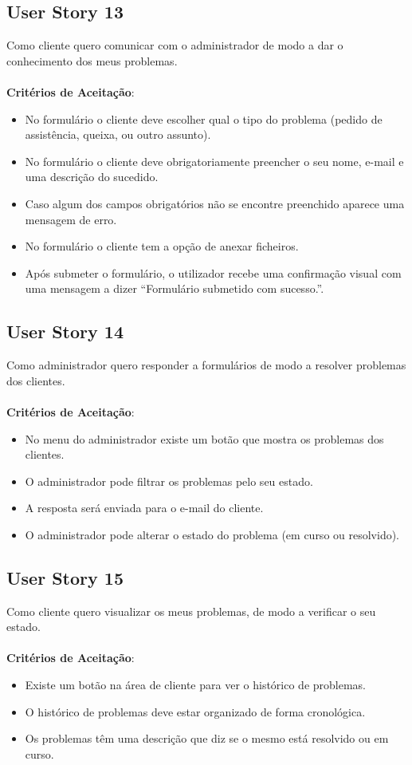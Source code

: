 \documentclass[a4paper,11pt]{article}
\begin{document}
\subsection{User Story 13}
Como cliente quero comunicar com o administrador de modo a dar o conhecimento dos meus problemas.\\\\
\textbf{Critérios de Aceitação}:
\begin{itemize}
  \item No formulário o cliente deve escolher qual o tipo do problema (pedido de assistência, queixa, ou outro assunto).
  \item No formulário o cliente deve obrigatoriamente preencher o seu nome, e-mail e uma descrição do sucedido.
  \item Caso algum dos campos obrigatórios não se encontre preenchido aparece uma mensagem de erro.
  \item No formulário o cliente tem a opção de anexar ficheiros.
  \item Após submeter o formulário, o utilizador recebe uma confirmação visual com uma mensagem a dizer “Formulário submetido com sucesso.”.
\end{itemize}
\subsection{User Story 14}
Como administrador quero responder a formulários de modo a resolver problemas dos clientes.\\\\
\textbf{Critérios de Aceitação}:
\begin{itemize}
  \item No menu do administrador existe um botão que mostra os problemas dos clientes.
  \item O administrador pode filtrar os problemas pelo seu estado.
  \item A resposta será enviada para o e-mail do cliente.
  \item O administrador pode alterar o estado do problema (em curso ou resolvido).
\end{itemize}
\subsection{User Story 15}
Como cliente quero visualizar os meus problemas, de modo a verificar o seu estado.\\\\
\textbf{Critérios de Aceitação}:
\begin{itemize}
  \item Existe um botão na área de cliente para ver o histórico de problemas.
  \item O histórico de problemas deve estar organizado de forma cronológica.
  \item Os problemas têm uma descrição que diz se o mesmo está resolvido ou em curso.
\end{itemize}
\end{document}
